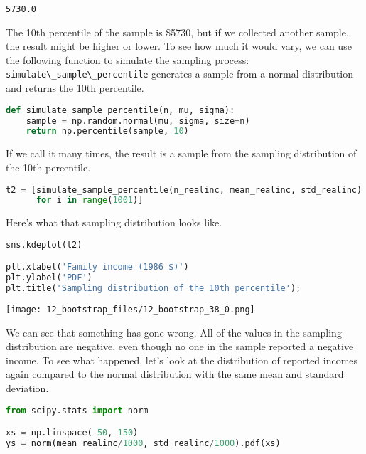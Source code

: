 \begin{lstlisting}[style=output]
5730.0
\end{lstlisting}

The 10th percentile of the sample is \$5730, but if we collected another
sample, the result might be higher or lower. To see how much it would
vary, we can use the following function to simulate the sampling
process: \passthrough{\lstinline!simulate\_sample\_percentile!}
generates a sample from a normal distribution and returns the 10th
percentile.

\begin{lstlisting}[language=Python,style=source]
def simulate_sample_percentile(n, mu, sigma):
    sample = np.random.normal(mu, sigma, size=n)
    return np.percentile(sample, 10)
\end{lstlisting}

If we call it many times, the result is a sample from the sampling
distribution of the 10th percentile.

\begin{lstlisting}[language=Python,style=source]
t2 = [simulate_sample_percentile(n_realinc, mean_realinc, std_realinc)
      for i in range(1001)]
\end{lstlisting}

Here's what that sampling distribution looks like.

\begin{lstlisting}[language=Python,style=source]
sns.kdeplot(t2)

plt.xlabel('Family income (1986 $)')
plt.ylabel('PDF')
plt.title('Sampling distribution of the 10th percentile');
\end{lstlisting}

\begin{center}
\texttt{[image: 12\_bootstrap\_files/12\_bootstrap\_38\_0.png]}
\end{center}

We can see that something has gone wrong. All of the values in the
sampling distribution are negative, even though no one in the sample
reported a negative income. To see what happened, let's look at the
distribution of reported incomes again compared to the normal
distribution with the same mean and standard deviation.

\begin{lstlisting}[language=Python,style=source]
from scipy.stats import norm

xs = np.linspace(-50, 150)
ys = norm(mean_realinc/1000, std_realinc/1000).pdf(xs)
\end{lstlisting}

